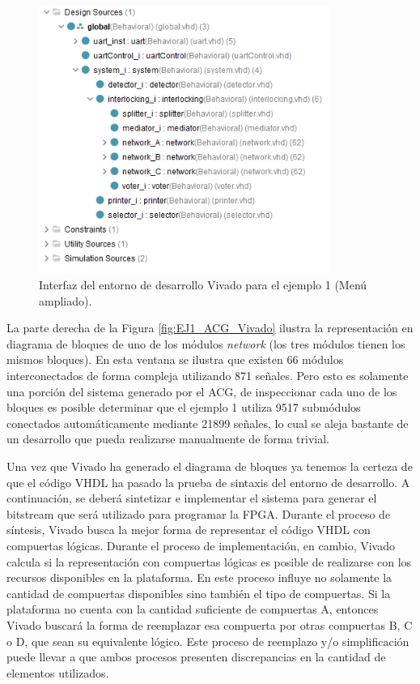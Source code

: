 	\begin{figure}[H]
		\centering
		\includegraphics[origin = c, width=0.85\textwidth]{resultados-obtenidos/ejemplo1/images/ACG_vivado_2}
		\centering\caption{Interfaz del entorno de desarrollo Vivado para el ejemplo 1 (Menú ampliado).}
		\label{fig:EJ1_ACG_Vivado_ampliado}
	\end{figure}
	
	La parte derecha de la Figura \ref{fig:EJ1_ACG_Vivado} ilustra la representación en diagrama de bloques de uno de los módulos \textit{network} (los tres módulos tienen los mismos bloques). En esta ventana se ilustra que existen 66 módulos interconectados de forma compleja utilizando 871 señales. Pero esto es solamente una porción del sistema generado por el ACG, de inspeccionar cada uno de los bloques es posible determinar que el ejemplo 1 utiliza 9517 submódulos conectados automáticamente mediante 21899 señales, lo cual se aleja bastante de un desarrollo que pueda realizarse manualmente de forma trivial.
	
	Una vez que Vivado ha generado el diagrama de bloques ya tenemos la certeza de que el código VHDL ha pasado la prueba de sintaxis del entorno de desarrollo. A continuación, se deberá sintetizar e implementar el sistema para generar el bitstream que será utilizado para programar la FPGA. Durante el proceso de síntesis, Vivado busca la mejor forma de representar el código VHDL con compuertas lógicas. Durante el proceso de implementación, en cambio, Vivado calcula si la representación con compuertas lógicas es posible de realizarse con los recursos disponibles en la plataforma. En este proceso influye no solamente la cantidad de compuertas disponibles sino también el tipo de compuertas. Si la plataforma no cuenta con la cantidad suficiente de compuertas A, entonces Vivado buscará la forma de reemplazar esa compuerta por otras compuertas B, C o D, que sean su equivalente lógico. Este proceso de reemplazo y/o simplificación puede llevar a que ambos procesos presenten discrepancias en la cantidad de elementos utilizados. 
	
